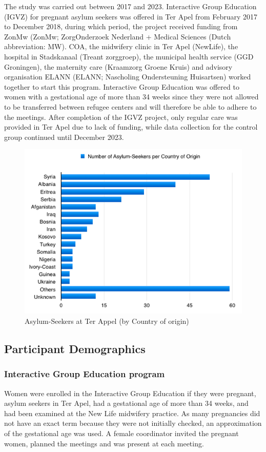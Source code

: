 \documentclass[12pt]{article}
\begin{document}
\noindent The study was carried out between 2017 and 2023. Interactive Group Education (IGVZ) for pregnant asylum seekers was offered in Ter Apel from February 2017 to December 2018, during which period, the project received funding from ZonMw (ZonMw; ZorgOnderzoek Nederland + Medical Sciences (Dutch abbreviation: MW). COA, the midwifery clinic in Ter Apel (NewLife), the hospital in Stadskanaal (Treant zorggroep), the municipal health service (GGD Groningen), the maternity care (Kraamzorg Groene Kruis) and advisory organisation ELANN (ELANN; Nascholing Ondersteuning Huisartsen) worked together to start this program. Interactive Group Education was offered to women with a gestational age of more than 34 weeks since they were not allowed to be transferred between refugee centers and will therefore be able to adhere to the meetings. After completion of the IGVZ project, only regular care was provided in Ter Apel due to lack of funding, while data collection for the control group continued until December 2023.
 
\begin{figure}
    \centering
    \includegraphics[width=0.5\linewidth]{bar-chart-country.png}
    \caption{Asylum-Seekers at Ter Appel (by Country of origin)}
    \label{fig:1}
\end{figure}

\subsection{Participant Demographics}
\subsubsection{Interactive Group Education program}

\noindent Women were enrolled in the Interactive Group Education if they were pregnant, asylum seekers in Ter Apel, had a gestational age of more than 34 weeks, and had been examined at the New Life midwifery practice. As many pregnancies did not have an exact term because they were not initially checked, an approximation of the gestational age was used. A female coordinator invited the pregnant women, planned the meetings and was present at each meeting. \\
\end{document}
